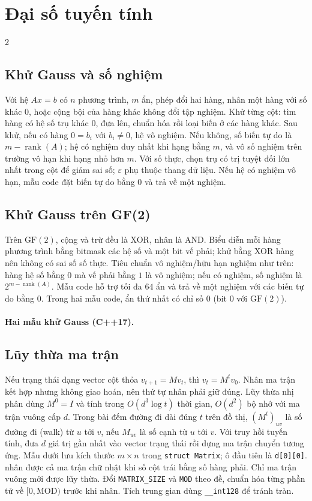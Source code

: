 \section{Đại số tuyến tính}
\begingroup\small
\begin{multicols}{2}
\subsection{Khử Gauss và số nghiệm}
Với hệ $Ax=b$ có $n$ phương trình, $m$ ẩn, phép đổi hai hàng,
nhân một hàng với số khác $0$, hoặc cộng bội của hàng khác
không đổi tập nghiệm. Khử từng cột: tìm hàng có hệ số trụ
khác $0$, đưa lên, chuẩn hóa rồi loại biến ở các hàng khác.
Sau khử, nếu có hàng $0=b_i$ với $b_i\ne0$, hệ vô nghiệm.
Nếu không, số biến tự do là $m-\operatorname{rank}(A)$;
hệ có nghiệm duy nhất khi hạng bằng $m$, và vô số nghiệm
trên trường vô hạn khi hạng nhỏ hơn $m$.
Với số thực, chọn trụ có trị tuyệt đối lớn nhất trong cột
để giảm sai số; $\varepsilon$ phụ thuộc thang dữ liệu.
Nếu hệ có nghiệm vô hạn, mẫu code đặt biến tự do bằng $0$
và trả về một nghiệm.

\subsection{Khử Gauss trên GF(2)}
Trên $\mathrm{GF}(2)$, cộng và trừ đều là XOR, nhân là AND.
Biểu diễn mỗi hàng phương trình bằng bitmask các hệ số và một
bit vế phải; khử bằng XOR hàng nên không có sai số số thực.
Tiêu chuẩn vô nghiệm/hữu hạn nghiệm như trên: hàng hệ số
bằng $0$ mà vế phải bằng $1$ là vô nghiệm; nếu có nghiệm,
số nghiệm là $2^{m-\operatorname{rank}(A)}$.
Mẫu code hỗ trợ tối đa $64$ ẩn và trả về một nghiệm với các
biến tự do bằng $0$. Trong hai mẫu code, ẩn thứ nhất có chỉ số
$0$ (bit $0$ với $\mathrm{GF}(2)$).

\paragraph{Hai mẫu khử Gauss (C++17).}

\subsection{Lũy thừa ma trận}
Nếu trạng thái dạng vector cột thỏa $v_{t+1}=Mv_t$, thì
$v_t=M^t v_0$. Nhân ma trận kết hợp nhưng không giao hoán,
nên thứ tự nhân phải giữ đúng. Lũy thừa nhị phân dùng
$M^0=I$ và tính trong $O(d^3\log t)$ thời gian,
$O(d^2)$ bộ nhớ với ma trận vuông cấp $d$.
Trong bài đếm đường đi dài đúng $t$ trên đồ thị,
$(M^t)_{uv}$ là số đường đi (walk) từ $u$ tới $v$,
nếu $M_{uv}$ là số cạnh từ $u$ tới $v$.
Với truy hồi tuyến tính, đưa $d$ giá trị gần nhất vào vector
trạng thái rồi dựng ma trận chuyển tương ứng.
Mẫu dưới lưu kích thước $m\times n$ trong \texttt{struct Matrix};
ô đầu tiên là \texttt{d[0][0]}.
nhân được cả ma trận chữ nhật khi số cột trái bằng số hàng phải.
Chỉ ma trận vuông mới được lũy thừa. Đổi \texttt{MATRIX\_SIZE}
và \texttt{MOD} theo đề, chuẩn hóa từng phần tử về $[0,\mathrm{MOD})$
trước khi nhân. Tích trung gian dùng \texttt{\_\_int128} để tránh tràn.


\end{multicols}
